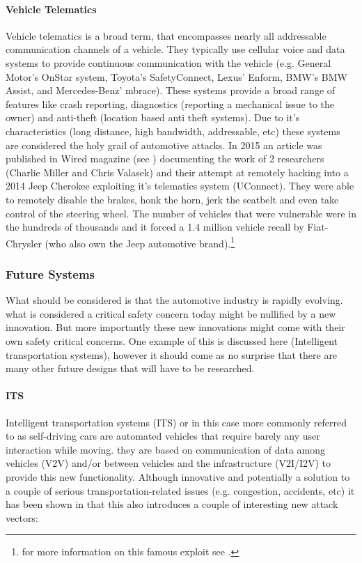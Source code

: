 \documentclass[master=cws,masteroption=vs,english]{kulemt}
\begin{document}
\paragraph{Vehicle Telematics} Vehicle telematics is a broad term, that encompasses nearly all addressable communication channels of a vehicle. They typically use cellular voice and data systems to provide continuous communication with the vehicle (e.g. General Motor's OnStar system, Toyota's SafetyConnect, Lexus' Enform, BMW's BMW Assist, and Mercedes-Benz' mbrace). These systems provide a broad range of features like crash reporting, diagnostics (reporting a mechanical issue to the owner) and anti-theft (location based anti theft systems)\cite{Kosher}. Due to it's characteristics (long distance, high bandwidth, addressable, etc) these systems are considered the holy grail of automotive attacks\cite{MillerA}. In 2015 an article was published in Wired magazine (see \cite{Wired}) documenting the work of 2 researchers (Charlie Miller and Chris Valasek) and their attempt at remotely hacking into a 2014 Jeep Cherokee exploiting it's telematics system (UConnect). They were able to remotely disable the brakes, honk the horn, jerk the seatbelt and even take control of the steering wheel\cite{Wired}. The number of vehicles that were vulnerable were in the hundreds of thousands and it forced a 1.4 million vehicle recall by Fiat-Chrysler (who also own the Jeep automotive brand).\footnote{for more information on this famous exploit see \cite{MillerD}.}

\subsubsection{Future Systems}
What should be considered is that the automotive industry is rapidly evolving. what is considered a critical safety concern today might be nullified by a new innovation. But more importantly these new innovations might come with their own safety critical concerns. One example of this is discussed here (Intelligent transportation systems), however it should come as no surprise that there are many other future designs that will have to be researched.

\paragraph{ITS} Intelligent transportation systems (ITS) or in this case more commonly referred to as self-driving cars are automated vehicles that require barely any user interaction while moving. they are based on communication of data among vehicles (V2V) and/or between vehicles and the infrastructure (V2I/I2V) to provide this new functionality. Although innovative and potentially a solution to a couple of serious transportation-related issues (e.g. congestion, accidents, etc) it has been shown in \cite{Petit} that this also introduces a couple of interesting new attack vectors:   
\end{document}
